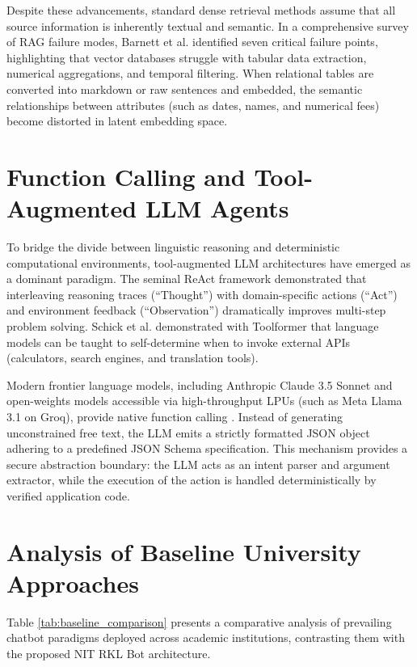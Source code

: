 \documentclass[12pt,a4paper]{report}
\begin{document}
Despite these advancements, standard dense retrieval methods assume that all source information is inherently textual and semantic. In a comprehensive survey of RAG failure modes, Barnett et al. \cite{barnett2024seven} identified seven critical failure points, highlighting that vector databases struggle with tabular data extraction, numerical aggregations, and temporal filtering. When relational tables are converted into markdown or raw sentences and embedded, the semantic relationships between attributes (such as dates, names, and numerical fees) become distorted in latent embedding space.

\section{Function Calling and Tool-Augmented LLM Agents}
To bridge the divide between linguistic reasoning and deterministic computational environments, tool-augmented LLM architectures have emerged as a dominant paradigm. The seminal ReAct framework \cite{yao2022react} demonstrated that interleaving reasoning traces (``Thought'') with domain-specific actions (``Act'') and environment feedback (``Observation'') dramatically improves multi-step problem solving. Schick et al. \cite{schick2023toolformer} demonstrated with Toolformer that language models can be taught to self-determine when to invoke external APIs (calculators, search engines, and translation tools).

Modern frontier language models, including Anthropic Claude 3.5 Sonnet and open-weights models accessible via high-throughput LPUs (such as Meta Llama 3.1 on Groq), provide native function calling \cite{anthropic2024claude, meta2024llama3}. Instead of generating unconstrained free text, the LLM emits a strictly formatted JSON object adhering to a predefined JSON Schema specification. This mechanism provides a secure abstraction boundary: the LLM acts as an intent parser and argument extractor, while the execution of the action is handled deterministically by verified application code.

\section{Analysis of Baseline University Approaches}
Table \ref{tab:baseline_comparison} presents a comparative analysis of prevailing chatbot paradigms deployed across academic institutions, contrasting them with the proposed NIT RKL Bot architecture.
\end{document}
